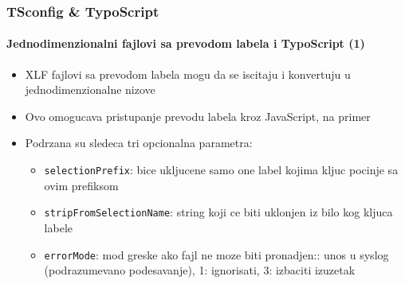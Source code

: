 \begin{frame}[fragile]
	\frametitle{TSconfig \& TypoScript}
	\framesubtitle{Jednodimenzionalni fajlovi sa prevodom labela i TypoScript (1)}

	\lstset{basicstyle=\tiny\ttfamily}

	\begin{itemize}

		\item XLF fajlovi sa prevodom labela mogu da se iscitaju i konvertuju u jednodimenzionalne nizove

		\item Ovo omogucava pristupanje prevodu labela kroz JavaScript, na primer

		\item Podrzana su sledeca tri opcionalna parametra:

			\begin{itemize}
				\item \texttt{selectionPrefix}:\newline
					bice ukljucene samo one label kojima kljuc pocinje sa ovim prefiksom
				\item \texttt{stripFromSelectionName}:\newline
					string koji ce biti uklonjen iz bilo kog kljuca labele
				\item \texttt{errorMode}:\newline
					mod greske ako fajl ne moze biti pronadjen:: unos u syslog (podrazumevano podesavanje), 1: ignorisati, 3: izbaciti izuzetak
			\end{itemize}

	\end{itemize}

\end{frame}

